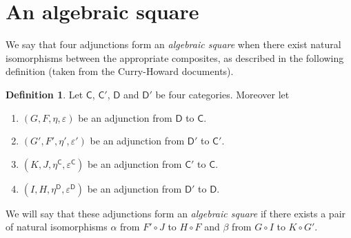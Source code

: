 \documentclass{amsart}
\theoremstyle{plain}
\theoremstyle{definition}
\newtheorem{definition}[theorem]{Definition}
\begin{document}
\section{An algebraic square}

We say that four adjunctions form an \emph{algebraic square} when there exist natural isomorphisms between the appropriate composites, as described in the following definition (taken from the Curry-Howard documents).

\begin{definition}\label{DefAlgSquare}
Let $\mathsf{C}$, $\mathsf{C}'$, $\mathsf{D}$ and $\mathsf{D}'$ be four categories. Moreover let
\begin{enumerate}
    \item
    $(G, F, \eta, \varepsilon)$ be an adjunction from $\mathsf{D}$ to $\mathsf{C}$.

    \item
    $(G', F', \eta', \varepsilon')$ be an adjunction from $\mathsf{D}'$ to $\mathsf{C}'$.

    \item
    $(K, J, \eta^{\mathsf{C}}, \varepsilon^{\mathsf{C}})$ be an adjunction from $\mathsf{C}'$ to $\mathsf{C}$.

    \item
    $(I, H, \eta^{\mathsf{D}}, \varepsilon^{\mathsf{D}})$ be an adjunction from $\mathsf{D}'$ to $\mathsf{D}$.
\end{enumerate}
We will say that these adjunctions form an \emph{algebraic square} if there exists a pair of natural isomorphisms $\alpha$ from $F' \circ J$ to $H \circ F$ and $\beta$ from $G \circ I$ to $K \circ G'$.

\begin{center}
\end{center}
\end{definition}
\end{document}
